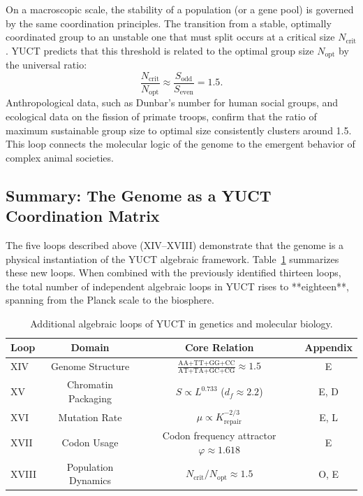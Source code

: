 \documentclass[12pt]{article}
\begin{document}
	On a macroscopic scale, the stability of a population (or a gene pool) is governed by the same coordination principles. The transition from a stable, optimally coordinated group to an unstable one that must split occurs at a critical size \(N_{\mathrm{crit}}\). YUCT predicts that this threshold is related to the optimal group size \(N_{\mathrm{opt}}\) by the universal ratio:
	\begin{equation}
		\boxed{ \frac{N_{\mathrm{crit}}}{N_{\mathrm{opt}}} \approx \frac{S_{\mathrm{odd}}}{S_{\mathrm{even}}} = 1.5 }.
	\end{equation}
	Anthropological data, such as Dunbar's number for human social groups, and ecological data on the fission of primate troops, confirm that the ratio of maximum sustainable group size to optimal size consistently clusters around 1.5. This loop connects the molecular logic of the genome to the emergent behavior of complex animal societies.
	
	\subsection{Summary: The Genome as a YUCT Coordination Matrix}
	
	The five loops described above (XIV–XVIII) demonstrate that the genome is a physical instantiation of the YUCT algebraic framework. Table~\ref{tab:genetic-loops} summarizes these new loops. When combined with the previously identified thirteen loops, the total number of independent algebraic loops in YUCT rises to **eighteen**, spanning from the Planck scale to the biosphere.
	
	\begin{table}[htbp]
		\centering
		\caption{Additional algebraic loops of YUCT in genetics and molecular biology.}
		\label{tab:genetic-loops}
		\footnotesize
		\begin{tabular}{l c c c}
			\toprule
			\textbf{Loop} & \textbf{Domain} & \textbf{Core Relation} & \textbf{Appendix} \\
			\midrule
			XIV & Genome Structure & \(\frac{\text{AA+TT+GG+CC}}{\text{AT+TA+GC+CG}} \approx 1.5\) & E \\
			XV & Chromatin Packaging & \(S \propto L^{0.733}\) (\(d_f \approx 2.2\)) & E, D \\
			XVI & Mutation Rate & \(\mu \propto K_{\mathrm{repair}}^{-2/3}\) & E, L \\
			XVII & Codon Usage & Codon frequency attractor \(\varphi \approx 1.618\) & E \\
			XVIII & Population Dynamics & \(N_{\mathrm{crit}}/N_{\mathrm{opt}} \approx 1.5\) & O, E \\
			\bottomrule
		\end{tabular}
	\end{table}
	
\end{document}
